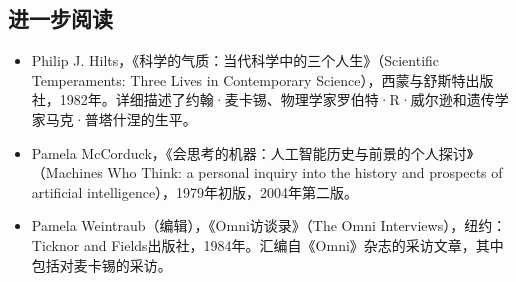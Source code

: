 \subsection{进一步阅读}
\begin{itemize}
\item Philip J. Hilts，《科学的气质：当代科学中的三个人生》（Scientific Temperaments: Three Lives in Contemporary Science），西蒙与舒斯特出版社，1982年。详细描述了约翰·麦卡锡、物理学家罗伯特·R·威尔逊和遗传学家马克·普塔什涅的生平。
\item Pamela McCorduck，《会思考的机器：人工智能历史与前景的个人探讨》（Machines Who Think: a personal inquiry into the history and prospects of artificial intelligence），1979年初版，2004年第二版。
\item Pamela Weintraub（编辑），《Omni访谈录》（The Omni Interviews），纽约：Ticknor and Fields出版社，1984年。汇编自《Omni》杂志的采访文章，其中包括对麦卡锡的采访。
\end{itemize}